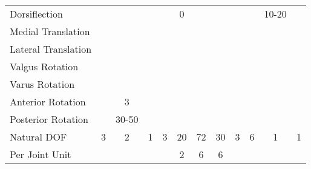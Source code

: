 \begin{sidewaystable}
{\begin{tabular}{l c c c c c c c c c c c}
			Dorsiflection                        & \textendash & \textendash     & \textendash & \textendash      & 0\textdegree                    & \textendash           & \textendash           & \textendash & \textendash           & 10-20\textdegree      & \textendash      \\
			Medial Translation                   & \textendash & \textendash     & \textendash & \textendash      & \textendash           & \textasteriskcentered & \textasteriskcentered & \textendash & \textasteriskcentered & \textendash & \textendash      \\
			Lateral Translation                  & \textendash & \textendash     & \textendash & \textendash      & \textendash           & \textasteriskcentered & \textasteriskcentered & \textendash & \textasteriskcentered & \textendash & \textendash      \\
			Valgus Rotation                      & \textendash & \textendash     & \textendash & \textendash      & \textendash           & \textendash           & \textendash           & \textendash & \textendash           & \textendash & \textendash      \\
			Varus Rotation                       & \textendash & \textendash     & \textendash & \textendash      & \textendash           & \textendash           & \textendash           & \textendash & \textendash           & \textendash & \textendash      \\
			Anterior Rotation                    & \textendash & 3\textdegree              & \textendash & \textendash      & \textendash           & \textendash           & \textendash           & \textendash & \textendash           & \textendash & \textendash      \\
			Posterior Rotation                   & \textendash & 30-50\textdegree          & \textendash & \textendash      & \textendash           & \textendash           & \textendash           & \textendash & \textendash           & \textendash & \textendash      \\
			Natural DOF                          & 3           & 2               & 1           & 3                & 20                    & 72                    & 30                    & 3           & 6                     & 1           & 1                \\
			Per Joint Unit                       &             &                 &             &                  & 2                     & 6                     & 6                     &             &                       &             &                  \\ \bottomrule
		\end{tabular}}
\end{sidewaystable}


